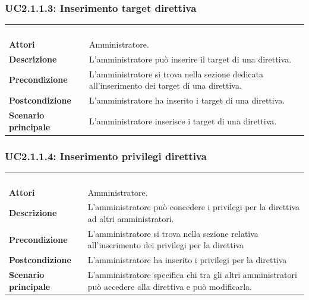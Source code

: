\subsubsection{UC2.1.1.3: Inserimento target direttiva}
\label{UC2.1.1.3}
\begin{longtable}{l|p{10cm}}
\rowcolor[gray]{0.8} \multicolumn{2}{c}{} \\
\rowcolor[gray]{0.8} \multicolumn{2}{c}{\textbf{UC2.1.1.3 - Inserimento target direttiva}} \\
\rowcolor[gray]{0.8} \multicolumn{2}{c}{} \\
\hline
&\\
\textbf{Attori} & Amministratore.\\[7pt]
\textbf{Descrizione} & L'amministratore può inserire il target di una direttiva.\\[7pt]
\textbf{Precondizione} & L'amministratore si trova nella sezione dedicata all'inserimento dei target di una direttiva.\\[7pt]
\textbf{Postcondizione} & L'amministratore ha inserito i target di una direttiva.\\[7pt]
\textbf{Scenario principale} &L'amministratore inserisce i target di una direttiva.\\[7pt]\hline
\end{longtable}

\subsubsection{UC2.1.1.4: Inserimento privilegi direttiva}
\label{UC2.1.1.4}
\begin{longtable}{l|p{10cm}}
\rowcolor[gray]{0.8} \multicolumn{2}{c}{} \\
\rowcolor[gray]{0.8} \multicolumn{2}{c}{\textbf{UC2.1.1.4 - Inserimento privilegi direttiva}} \\
\rowcolor[gray]{0.8} \multicolumn{2}{c}{} \\
\hline
&\\
\textbf{Attori} & Amministratore.\\[7pt]
\textbf{Descrizione} & L'amministratore può concedere i privilegi per la direttiva ad altri amministratori.\\[7pt]
\textbf{Precondizione} & L'amministratore si trova nella sezione relativa all'inserimento dei privilegi per la direttiva\\[7pt]
\textbf{Postcondizione} & L'amministratore ha inserito i privilegi per la direttiva\\[7pt]
\textbf{Scenario principale} &L'amministratore specifica chi tra gli altri amministratori può accedere alla direttiva e può modificarla.\\[7pt]\hline
\end{longtable}

